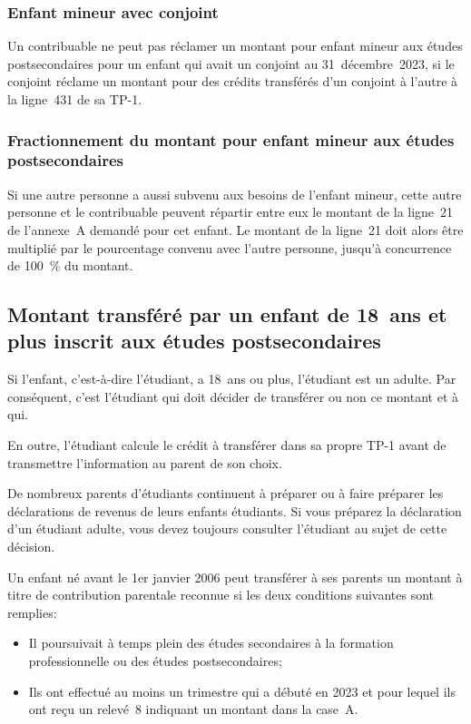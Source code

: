 \subsubsection{Enfant mineur avec conjoint}
Un contribuable ne peut pas réclamer un montant pour enfant mineur aux études postsecondaires pour un enfant qui avait un conjoint au 31~décembre~2023, si le conjoint réclame un montant pour des crédits transférés d'un conjoint à l'autre à la ligne~431 de sa TP-1.

\subsubsection{Fractionnement du montant pour enfant mineur aux études postsecondaires}
Si une autre personne a aussi subvenu aux besoins de l'enfant mineur, cette autre personne et le contribuable peuvent répartir entre eux le montant de la ligne~21 de l'annexe~A demandé pour cet enfant. Le montant de la ligne~21 doit alors être multiplié par le pourcentage convenu avec l'autre personne, jusqu'à concurrence de 100~\% du montant.


\subsection{Montant transféré par un enfant de 18~ans et plus inscrit aux études postsecondaires}
Si l'enfant, c'est-à-dire l'étudiant, a 18~ans ou plus, l'étudiant est un adulte. Par conséquent, c'est l'étudiant qui doit décider de transférer ou non ce montant et à qui.

En outre, l'étudiant calcule le crédit à transférer dans sa propre TP-1 avant de transmettre l'information au \og parent \fg{} de son choix.

De nombreux parents d'étudiants continuent à préparer ou à faire préparer les déclarations de revenus de leurs enfants étudiants. Si vous préparez la déclaration d'un étudiant adulte, vous devez toujours consulter l'étudiant au sujet de cette décision.

Un enfant né avant le 1er janvier 2006 peut transférer à ses parents un montant à titre de contribution parentale reconnue si les deux conditions suivantes sont remplies:
\begin{itemize}
	\item Il poursuivait à temps plein des études secondaires à la formation professionnelle ou des études postsecondaires;
	\item Ils ont effectué au moins un trimestre qui a débuté en 2023 et pour lequel ils ont reçu un relevé~8 indiquant un montant dans la case~A.
\end{itemize}

